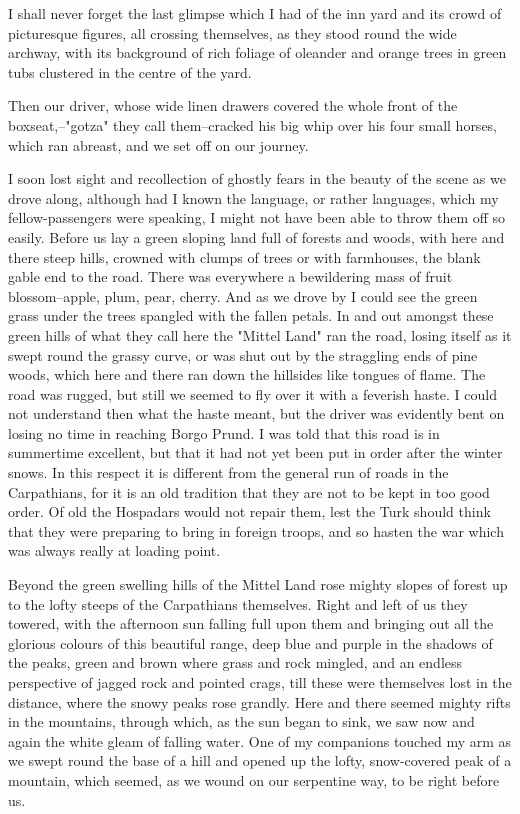 I shall never forget the last glimpse which I had of the inn yard and its crowd of picturesque figures, all crossing themselves, as they stood round the wide archway, with its background of rich foliage of oleander and orange trees in green tubs clustered in the centre of the yard.

Then our driver, whose wide linen drawers covered the whole front of the boxseat,--"gotza" they call them--cracked his big whip over his four small horses, which ran abreast, and we set off on our journey.

I soon lost sight and recollection of ghostly fears in the beauty of the scene as we drove along, although had I known the language, or rather languages, which my fellow-passengers were speaking, I might not have been able to throw them off so easily. Before us lay a green sloping land full of forests and woods, with here and there steep hills, crowned with clumps of trees or with farmhouses, the blank gable end to the road. There was everywhere a bewildering mass of fruit blossom--apple, plum, pear, cherry. And as we drove by I could see the green grass under the trees spangled with the fallen petals. In and out amongst these green hills of what they call here the "Mittel Land" ran the road, losing itself as it swept round the grassy curve, or was shut out by the straggling ends of pine woods, which here and there ran down the hillsides like tongues of flame. The road was rugged, but still we seemed to fly over it with a feverish haste. I could not understand then what the haste meant, but the driver was evidently bent on losing no time in reaching Borgo Prund. I was told that this road is in summertime excellent, but that it had not yet been put in order after the winter snows. In this respect it is different from the general run of roads in the Carpathians, for it is an old tradition that they are not to be kept in too good order. Of old the Hospadars would not repair them, lest the Turk should think that they were preparing to bring in foreign troops, and so hasten the war which was always really at loading point.

Beyond the green swelling hills of the Mittel Land rose mighty slopes of forest up to the lofty steeps of the Carpathians themselves. Right and left of us they towered, with the afternoon sun falling full upon them and bringing out all the glorious colours of this beautiful range, deep blue and purple in the shadows of the peaks, green and brown where grass and rock mingled, and an endless perspective of jagged rock and pointed crags, till these were themselves lost in the distance, where the snowy peaks rose grandly. Here and there seemed mighty rifts in the mountains, through which, as the sun began to sink, we saw now and again the white gleam of falling water. One of my companions touched my arm as we swept round the base of a hill and opened up the lofty, snow-covered peak of a mountain, which seemed, as we wound on our serpentine way, to be right before us.

